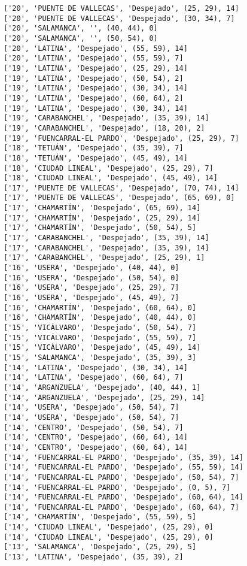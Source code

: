 \documentclass[11pt]{article}
\begin{document}
\begin{Verbatim}[commandchars=\\\{\}]
['20', 'PUENTE DE VALLECAS', 'Despejado', (25, 29), 14]
['20', 'PUENTE DE VALLECAS', 'Despejado', (30, 34), 7]
['20', 'SALAMANCA', '', (40, 44), 0]
['20', 'SALAMANCA', '', (50, 54), 0]
['20', 'LATINA', 'Despejado', (55, 59), 14]
['20', 'LATINA', 'Despejado', (55, 59), 7]
['19', 'LATINA', 'Despejado', (25, 29), 14]
['19', 'LATINA', 'Despejado', (50, 54), 2]
['19', 'LATINA', 'Despejado', (30, 34), 14]
['19', 'LATINA', 'Despejado', (60, 64), 2]
['19', 'LATINA', 'Despejado', (30, 34), 14]
['19', 'CARABANCHEL', 'Despejado', (35, 39), 14]
['19', 'CARABANCHEL', 'Despejado', (18, 20), 2]
['19', 'FUENCARRAL-EL PARDO', 'Despejado', (25, 29), 7]
['18', 'TETUÁN', 'Despejado', (35, 39), 7]
['18', 'TETUÁN', 'Despejado', (45, 49), 14]
['18', 'CIUDAD LINEAL', 'Despejado', (25, 29), 7]
['18', 'CIUDAD LINEAL', 'Despejado', (45, 49), 14]
['17', 'PUENTE DE VALLECAS', 'Despejado', (70, 74), 14]
['17', 'PUENTE DE VALLECAS', 'Despejado', (65, 69), 0]
['17', 'CHAMARTÍN', 'Despejado', (65, 69), 14]
['17', 'CHAMARTÍN', 'Despejado', (25, 29), 14]
['17', 'CHAMARTÍN', 'Despejado', (50, 54), 5]
['17', 'CARABANCHEL', 'Despejado', (35, 39), 14]
['17', 'CARABANCHEL', 'Despejado', (35, 39), 14]
['17', 'CARABANCHEL', 'Despejado', (25, 29), 1]
['16', 'USERA', 'Despejado', (40, 44), 0]
['16', 'USERA', 'Despejado', (50, 54), 0]
['16', 'USERA', 'Despejado', (25, 29), 7]
['16', 'USERA', 'Despejado', (45, 49), 7]
['16', 'CHAMARTÍN', 'Despejado', (60, 64), 0]
['16', 'CHAMARTÍN', 'Despejado', (40, 44), 0]
['15', 'VICÁLVARO', 'Despejado', (50, 54), 7]
['15', 'VICÁLVARO', 'Despejado', (55, 59), 7]
['15', 'VICÁLVARO', 'Despejado', (45, 49), 14]
['15', 'SALAMANCA', 'Despejado', (35, 39), 3]
['14', 'LATINA', 'Despejado', (30, 34), 14]
['14', 'LATINA', 'Despejado', (60, 64), 7]
['14', 'ARGANZUELA', 'Despejado', (40, 44), 1]
['14', 'ARGANZUELA', 'Despejado', (25, 29), 14]
['14', 'USERA', 'Despejado', (50, 54), 7]
['14', 'USERA', 'Despejado', (50, 54), 7]
['14', 'CENTRO', 'Despejado', (50, 54), 7]
['14', 'CENTRO', 'Despejado', (60, 64), 14]
['14', 'CENTRO', 'Despejado', (60, 64), 14]
['14', 'FUENCARRAL-EL PARDO', 'Despejado', (35, 39), 14]
['14', 'FUENCARRAL-EL PARDO', 'Despejado', (55, 59), 14]
['14', 'FUENCARRAL-EL PARDO', 'Despejado', (50, 54), 7]
['14', 'FUENCARRAL-EL PARDO', 'Despejado', (0, 5), 7]
['14', 'FUENCARRAL-EL PARDO', 'Despejado', (60, 64), 14]
['14', 'FUENCARRAL-EL PARDO', 'Despejado', (60, 64), 7]
['14', 'CHAMARTÍN', 'Despejado', (55, 59), 5]
['14', 'CIUDAD LINEAL', 'Despejado', (25, 29), 0]
['14', 'CIUDAD LINEAL', 'Despejado', (25, 29), 0]
['13', 'SALAMANCA', 'Despejado', (25, 29), 5]
['13', 'LATINA', 'Despejado', (35, 39), 2]

\end{Verbatim}
\end{document}
